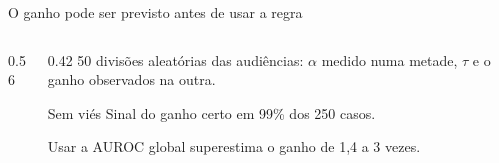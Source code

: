 \documentclass[aspectratio=169,11pt]{beamer}
\begin{document}
\begin{frame}{O ganho pode ser previsto antes de usar a regra}
  \begin{columns}[c]
    \begin{column}{0.56\textwidth}
      \begin{table}\centering\small
      \end{table}
    \end{column}
    \begin{column}{0.42\textwidth}
      \small
      50 divisões aleatórias das audiências: $\alpha$ medido numa metade, $\tau$ e o ganho observados na outra.\\[4pt]
      \begin{exampleblock}{\centering Sem viés}
        \centering Sinal do ganho certo em 99\% dos 250 casos.
      \end{exampleblock}
      Usar a AUROC global superestima o ganho de 1,4 a 3 vezes.
    \end{column}
  \end{columns}
\end{frame}
\end{document}

